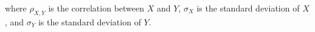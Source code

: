 \noindent where
$
\rho_{X, Y}
$
is the correlation between
$
X
$
and
$
Y
$,
$
\sigma_{X}
$
is the standard deviation of
$
X
$,
and
$
\sigma_{Y}
$
is the standard deviation of
$
Y
$.
